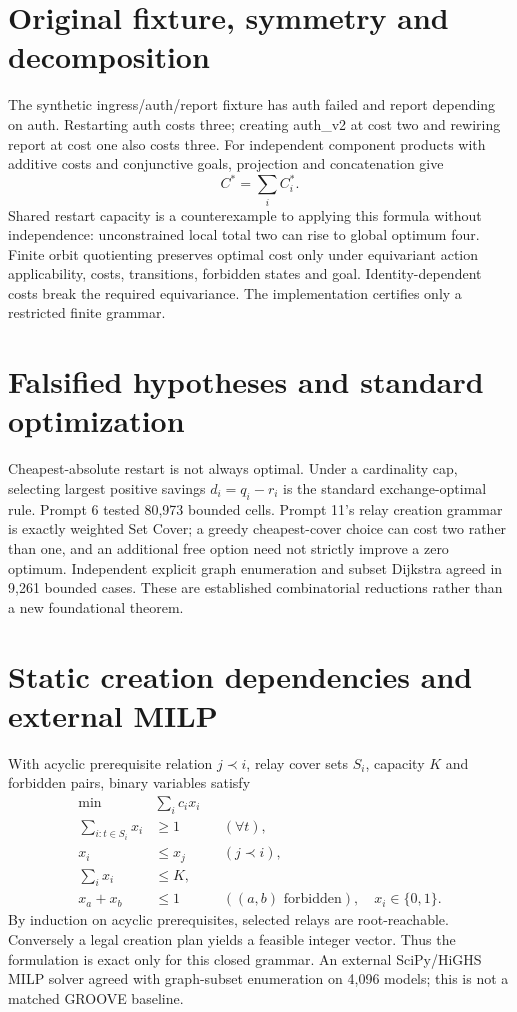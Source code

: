 \documentclass[10pt,a4paper]{article}
\begin{document}
\section{Original fixture, symmetry and decomposition}
The synthetic ingress/auth/report fixture has auth failed and report depending on auth. Restarting auth costs three; creating auth\_v2 at cost two and rewiring report at cost one also costs three. For independent component products with additive costs and conjunctive goals, projection and concatenation give
\[
 C^*=\sum_i C_i^*.
\]
Shared restart capacity is a counterexample to applying this formula without independence: unconstrained local total two can rise to global optimum four. Finite orbit quotienting preserves optimal cost only under equivariant action applicability, costs, transitions, forbidden states and goal. Identity-dependent costs break the required equivariance. The implementation certifies only a restricted finite grammar.
\section{Falsified hypotheses and standard optimization}
Cheapest-absolute restart is not always optimal. Under a cardinality cap, selecting largest positive savings $d_i=q_i-r_i$ is the standard exchange-optimal rule. Prompt 6 tested 80,973 bounded cells. Prompt 11's relay creation grammar is exactly weighted Set Cover; a greedy cheapest-cover choice can cost two rather than one, and an additional free option need not strictly improve a zero optimum. Independent explicit graph enumeration and subset Dijkstra agreed in 9,261 bounded cases. These are established combinatorial reductions rather than a new foundational theorem.
\section{Static creation dependencies and external MILP}
With acyclic prerequisite relation $j\prec i$, relay cover sets $S_i$, capacity $K$ and forbidden pairs, binary variables satisfy
\begin{align*}
\min\quad&\sum_i c_i x_i\\
\sum_{i:t\in S_i}x_i&\ge1 &&(\forall t),\\
x_i&\le x_j &&(j\prec i),\\
\sum_i x_i&\le K,\\
x_a+x_b&\le1 &&((a,b)\text{ forbidden}),\quad x_i\in\{0,1\}.
\end{align*}
By induction on acyclic prerequisites, selected relays are root-reachable. Conversely a legal creation plan yields a feasible integer vector. Thus the formulation is exact only for this closed grammar. An external SciPy/HiGHS MILP solver agreed with graph-subset enumeration on 4,096 models; this is not a matched GROOVE baseline.
\end{document}
